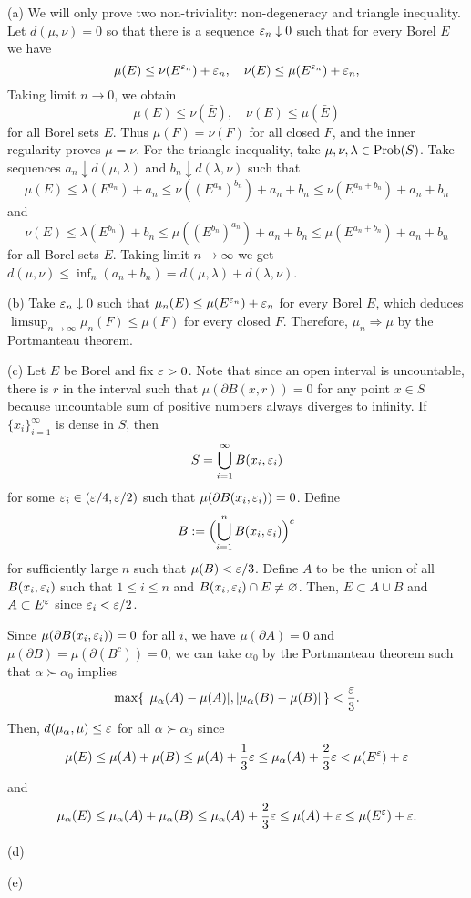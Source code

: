 \documentclass[10pt]{article}
\begin{document}
\begin{pf}
(a)
We will only prove two non-triviality: non-degeneracy and triangle inequality.
Let $d(\mu,\nu)=0$ so that there is a sequence $\varepsilon_n\downarrow0$ such that for every Borel $E$ we have
\[\mu(E)\le\nu(E^{\varepsilon_n})+\varepsilon_n,\quad\nu(E)\le\mu(E^{\varepsilon_n})+\varepsilon_n,\]
Taking limit $n\to0$, we obtain
\[\mu(E)\le\nu(\bar E),\quad\nu(E)\le\mu(\bar E)\]
for all Borel sets $E$.
Thus $\mu(F)=\nu(F)$ for all closed $F$, and the inner regularity proves $\mu=\nu$.
For the triangle inequality, take $\mu,\nu,\lambda\in\operatorname{Prob}(S)$.
Take sequences $a_n\downarrow d(\mu,\lambda)$ and $b_n\downarrow d(\lambda,\nu)$ such that
\[\mu(E)\le\lambda(E^{a_n})+a_n\le\nu((E^{a_n})^{b_n})+a_n+b_n\le\nu(E^{a_n+b_n})+a_n+b_n\]
and
\[\nu(E)\le\lambda(E^{b_n})+b_n\le\mu((E^{b_n})^{a_n})+a_n+b_n\le\mu(E^{a_n+b_n})+a_n+b_n\]
for all Borel sets $E$.
Taking limit $n\to\infty$ we get $d(\mu,\nu)\le\inf_n(a_n+b_n)=d(\mu,\lambda)+d(\lambda,\nu)$.

(b)
Take $\varepsilon_n\downarrow0$ such that $\mu_n(E)\le\mu(E^{\varepsilon_n})+\varepsilon_n$ for every Borel $E$, which deduces $\limsup_{n\to\infty}\mu_n(F)\le\mu(F)$ for every closed $F$.
Therefore, $\mu_n\Rightarrow\mu$ by the Portmanteau theorem.

(c)
Let $E$ be Borel and fix $\varepsilon>0$.
Note that since an open interval is uncountable, there is $r$ in the interval such that $\mu(\partial B(x,r))=0$ for any point $x\in S$ because uncountable sum of positive numbers always diverges to infinity.
If $\{x_i\}_{i=1}^\infty$ is dense in $S$, then
\[S=\bigcup_{i=1}^\infty B(x_i,\varepsilon_i)\]
for some $\varepsilon_i\in(\varepsilon/4,\varepsilon/2)$ such that $\mu(\partial B(x_i,\varepsilon_i))=0$.
Define
\[B:=\Bigl(\bigcup_{i=1}^nB(x_i,\varepsilon_i)\Bigr)^c\]
for sufficiently large $n$ such that $\mu(B)<\varepsilon/3$.
Define $A$ to be the union of all $B(x_i,\varepsilon_i)$ such that $1\le i\le n$ and $B(x_i,\varepsilon_i)\cap E\ne\varnothing$.
Then, $E\subset A\cup B$ and $A\subset E^\varepsilon$ since $\varepsilon_i<\varepsilon/2$.

Since $\mu(\partial B(x_i,\varepsilon_i))=0$ for all $i$, we have $\mu(\partial A)=0$ and $\mu(\partial B)=\mu(\partial(B^c))=0$, we can take $\alpha_0$ by the Portmanteau theorem such that $\alpha\succ\alpha_0$ implies
\[\max\{\,|\mu_\alpha(A)-\mu(A)|,|\mu_\alpha(B)-\mu(B)|\,\}<\frac{\varepsilon}3.\]
Then, $d(\mu_\alpha,\mu)\le\varepsilon$ for all $\alpha\succ\alpha_0$ since
\[\mu(E)\le\mu(A)+\mu(B)\le\mu(A)+\frac13\varepsilon\le\mu_\alpha(A)+\frac23\varepsilon<\mu(E^\varepsilon)+\varepsilon\]
and
\[\mu_\alpha(E)\le\mu_\alpha(A)+\mu_\alpha(B)\le\mu_\alpha(A)+\frac23\varepsilon\le\mu(A)+\varepsilon\le\mu(E^\varepsilon)+\varepsilon.\]

(d)

(e)
\end{pf}
\end{document}
